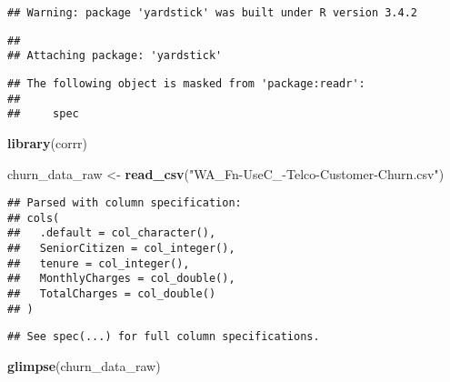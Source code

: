 \documentclass[]{article}
\newenvironment{Shaded}{\begin{snugshade}}{\end{snugshade}}
\newcommand{\KeywordTok}[1]{\textcolor[rgb]{0.13,0.29,0.53}{\textbf{#1}}}
\newcommand{\StringTok}[1]{\textcolor[rgb]{0.31,0.60,0.02}{#1}}
\newcommand{\NormalTok}[1]{#1}
\begin{document}
\begin{verbatim}
## Warning: package 'yardstick' was built under R version 3.4.2
\end{verbatim}

\begin{verbatim}
## 
## Attaching package: 'yardstick'
\end{verbatim}

\begin{verbatim}
## The following object is masked from 'package:readr':
## 
##     spec
\end{verbatim}

\begin{Shaded}
\begin{Highlighting}[]
\KeywordTok{library}\NormalTok{(corrr)}
\end{Highlighting}
\end{Shaded}

\begin{Shaded}
\begin{Highlighting}[]
\NormalTok{churn_data_raw <-}\StringTok{ }\KeywordTok{read_csv}\NormalTok{(}\StringTok{"WA_Fn-UseC_-Telco-Customer-Churn.csv"}\NormalTok{)}
\end{Highlighting}
\end{Shaded}

\begin{verbatim}
## Parsed with column specification:
## cols(
##   .default = col_character(),
##   SeniorCitizen = col_integer(),
##   tenure = col_integer(),
##   MonthlyCharges = col_double(),
##   TotalCharges = col_double()
## )
\end{verbatim}

\begin{verbatim}
## See spec(...) for full column specifications.
\end{verbatim}

\begin{Shaded}
\begin{Highlighting}[]
\KeywordTok{glimpse}\NormalTok{(churn_data_raw)}
\end{Highlighting}
\end{Shaded}
\end{document}
